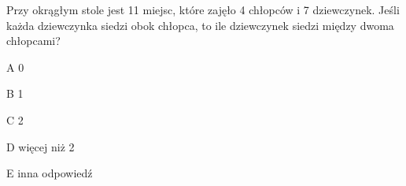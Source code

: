 \begin{tresc}
Przy okrągłym stole jest 11 miejsc, które zajęło 4 chłopców i 7 dziewczynek. Jeśli każda dziewczynka siedzi obok chłopca, to ile dziewczynek siedzi między dwoma chłopcami?
\end{tresc}
\begin{wariant}{A} 0 \end{wariant}
\begin{wariant}{B} 1 \end{wariant}
\begin{wariant}{C} 2 \end{wariant}
\begin{wariant}{D} więcej niż 2 \end{wariant}
\begin{wariant}{E} inna odpowiedź \end{wariant}

